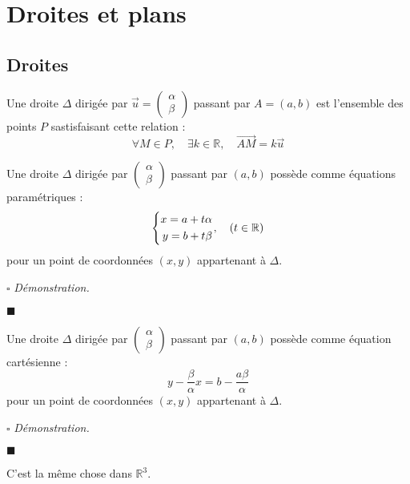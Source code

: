 \documentclass[a4paper, titlepage]{article}
\newenvironment{system}%
{\left\lbrace\begin{align}}%
{\end{align}\right.}
\renewenvironment{proof}{$\square$ \footnotesize\textit{Démonstration.}}{\begin{flushright}$\blacksquare$\end{flushright}}
\begin{document}
	\section{Droites et plans}
	\subsection{Droites}
	\begin{defn}
		Une droite $\Delta$ dirigée par $\vec u = \begin{pmatrix} \alpha\\\beta \end{pmatrix}$ passant par $A=(a,b)$ est l'ensemble des points $P$ sastisfaisant cette relation :
		$$ \forall M\in P,\quad\exists k\in\mathbb{R},\quad \overrightarrow{AM} = k\vec u $$
	\end{defn}
	\begin{props}
		Une droite $\Delta$ dirigée par $\begin{pmatrix} \alpha\\\beta \end{pmatrix}$ passant par $(a,b)$ possède comme équations paramétriques :
		$$\begin{system}
			x=a+t\alpha\\
			y=b+t\beta
		\end{system},\quad (t\in\mathbb{R})$$
		pour un point de coordonnées $(x,y)$ appartenant à $\Delta$.
	\end{props}
	\begin{proof}
		\AQT
	\end{proof}
	\begin{props}
		Une droite $\Delta$ dirigée par $\begin{pmatrix} \alpha\\\beta \end{pmatrix}$ passant par $(a,b)$ possède comme équation cartésienne : 
		$$ y-\frac{\beta}{\alpha}x=b-\frac{a\beta}{\alpha} $$
		pour un point de coordonnées $(x,y)$ appartenant à $\Delta$.
	\end{props}
	\begin{proof}
		\AQT
	\end{proof}
	C'est la même chose dans $\mathbb{R}^3$.
\end{document}

